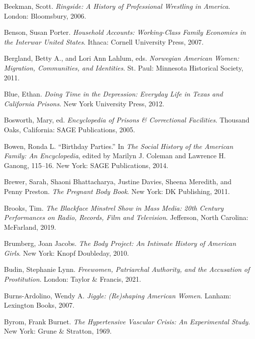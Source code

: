 \documentclass[
  letterpaper,
]{book}
\newlength{\cslhangindent}
\newenvironment{CSLReferences}[2] %
 {\begin{list}{}{%
  \setlength{\itemindent}{0pt}
  \setlength{\leftmargin}{0pt}
  \setlength{\parsep}{0pt}
  \ifodd #1
   \setlength{\leftmargin}{\cslhangindent}
   \setlength{\itemindent}{-1\cslhangindent}
  \fi
  \setlength{\itemsep}{#2\baselineskip}}}
 {\end{list}}
\begin{document}
\begin{CSLReferences}{1}{0}
Beekman, Scott. \emph{Ringside: A History of Professional Wrestling in
America}. London: Bloomsbury, 2006.

Benson, Susan Porter. \emph{Household Accounts: Working-Class Family
Economies in the Interwar United States}. Ithaca: Cornell University
Press, 2007.

Bergland, Betty A., and Lori Ann Lahlum, eds. \emph{Norwegian American
Women: Migration, Communities, and Identities}. St. Paul: Minnesota
Historical Society, 2011.

Blue, Ethan. \emph{Doing Time in the Depression: Everyday Life in Texas
and California Prisons}. New York University Press, 2012.

Bosworth, Mary, ed. \emph{Encyclopedia of Prisons \& Correctional
Facilities}. Thousand Oaks, California: SAGE Publications, 2005.

Bowen, Ronda L. {``Birthday Parties.''} In \emph{The Social History of
the American Family: An Encyclopedia}, edited by Marilyn J. Coleman and
Lawrence H. Ganong, 115--16. New York: SAGE Publications, 2014.

Brewer, Sarah, Shaoni Bhattacharya, Justine Davies, Sheena Meredith, and
Penny Preston. \emph{The Pregnant Body Book}. New York: DK Publishing,
2011.

Brooks, Tim. \emph{The Blackface Minstrel Show in Mass Media: 20th
Century Performances on Radio, Records, Film and Television}. Jefferson,
North Carolina: McFarland, 2019.

Brumberg, Joan Jacobs. \emph{The Body Project: An Intimate History of
American Girls}. New York: Knopf Doubleday, 2010.

Budin, Stephanie Lynn. \emph{Freewomen, Patriarchal Authority, and the
Accusation of Prostitution}. London: Taylor \& Francis, 2021.

Burns-Ardolino, Wendy A. \emph{Jiggle: (Re)shaping American Women}.
Lanham: Lexington Books, 2007.

Byrom, Frank Burnet. \emph{The Hypertensive Vascular Crisis: An
Experimental Study}. New York: Grune \& Stratton, 1969.


\end{CSLReferences}
\end{document}
